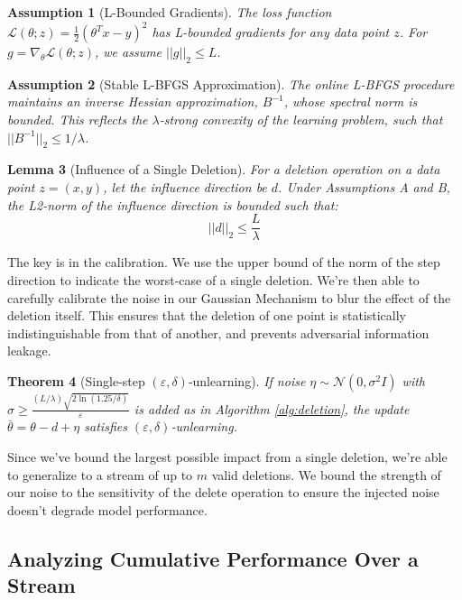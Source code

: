 \documentclass[a4paper,12pt]{article}
\newtheorem{theorem}{Theorem}[section]
\newtheorem{lemma}[theorem]{Lemma}
\newtheorem{assumption}[theorem]{Assumption}
\begin{document}
\begin{assumption}[L-Bounded Gradients]
\label{assum:lipschitz}
The loss function $\mathcal{L}(\theta; z) = \frac{1}{2}(\theta^T x - y)^2$ has L-bounded gradients for any data point $z$. For $g = \nabla_\theta \mathcal{L}(\theta; z)$, we assume $||g||_2 \leq L$.
\end{assumption}

\begin{assumption}[Stable L-BFGS Approximation]
\label{assum:stable-lbfgs}
The online L-BFGS procedure maintains an inverse Hessian approximation, $B^{-1}$, whose spectral norm is bounded. This reflects the $\lambda$-strong convexity of the learning problem, such that $||B^{-1}||_2 \leq 1/\lambda$.
\end{assumption}

\begin{lemma}[Influence of a Single Deletion]
\label{lem:bounded-influence}
For a deletion operation on a data point $z=(x, y)$, let the influence direction be $d$. Under Assumptions A and B, the L2-norm of the influence direction is bounded such that:
$$
||d||_2 \leq \frac{L}{\lambda}
$$
\end{lemma}

The key is in the calibration. We use the upper bound of the norm of the step direction to indicate the worst-case of a single deletion. We're then able to carefully calibrate the noise in our Gaussian Mechanism to blur the effect of the deletion itself. This ensures that the deletion of one point is statistically indistinguishable from that of another, and prevents adversarial information leakage.

\begin{theorem}[Single‑step $(\varepsilon,\delta)$‑unlearning]
\label{thm:single-step-unlearning}
If noise $\eta\sim\mathcal N(0,\sigma^2 I)$ with  
$\sigma \ge \frac{(L/\lambda)\sqrt{2\ln(1.25/\delta)}}{\varepsilon}$  
is added as in Algorithm \ref{alg:deletion}, the update
$\bar\theta=\theta-d+\eta$ satisfies $(\varepsilon,\delta)$‑unlearning.
\end{theorem}

Since we've bound the largest possible impact from a single deletion, we're able to generalize to a stream of up to $m$ valid deletions. We bound the strength of our noise to the sensitivity of the delete operation to ensure the injected noise doesn't degrade model performance.
\subsection{Analyzing Cumulative Performance Over a Stream}
\end{document}
